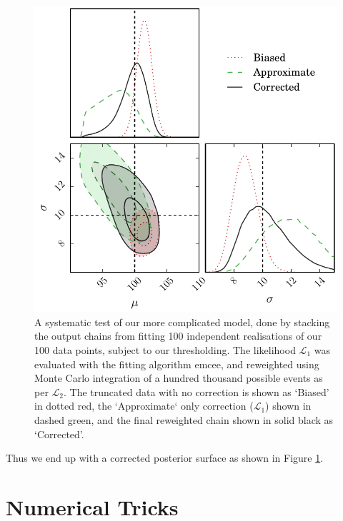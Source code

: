 \documentclass[a4paper,fleqn,usenatbib]{mnras}
\begin{document}
\begin{figure}
	\begin{center}
		\includegraphics[width=\columnwidth]{example/real.pdf}
	\end{center}
	\caption{A systematic test of our more complicated model, done by stacking the output chains from fitting 100 independent realisations of our 100 data points, subject to our thresholding. The likelihood $\mathcal{L}_1$ was evaluated with the fitting algorithm emcee, and reweighted using Monte Carlo integration of a hundred thousand possible events as per $\mathcal{L}_2$. The truncated data with no correction is shown as `Biased' in dotted red, the `Approximate` only correction ($\mathcal{L}_1$) shown in dashed green, and the final reweighted chain shown in solid black as `Corrected'.}
	\label{fig:real}
\end{figure}
Thus we end up with a corrected posterior surface as shown in Figure \ref{fig:real}.














\section{Numerical Tricks}
\label{sec:tricks}
\end{document}
